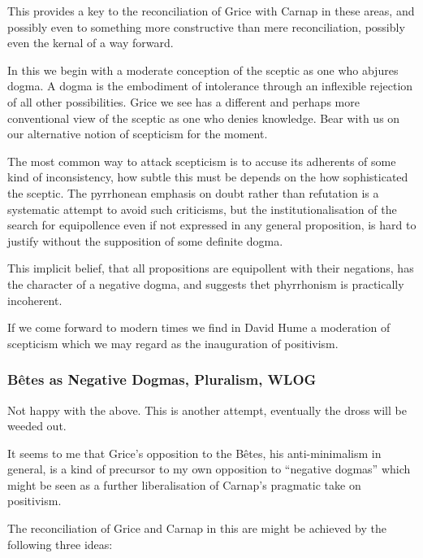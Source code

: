 \documentclass[10pt,titlepage]{book}
\begin{document}
This provides a key to the reconciliation of Grice with Carnap in these areas, and possibly even to something more constructive than mere reconciliation, possibly even the kernal of a way forward.

In this we begin with a moderate conception of the sceptic as one who abjures dogma.
A dogma is the embodiment of intolerance through an inflexible rejection of all other possibilities.
Grice we see has a different and perhaps more conventional view of the sceptic as one who denies knowledge.
Bear with us on our alternative notion of scepticism for the moment.

The most common way to attack scepticism is to accuse its adherents of some kind of inconsistency, how subtle this must be depends on the how sophisticated the sceptic.
The pyrrhonean emphasis on doubt rather than refutation is a systematic attempt to avoid such criticisms, but the institutionalisation of the search for equipollence even if not expressed in any general proposition, is hard to justify without the supposition of some definite dogma.

This implicit belief, that all propositions are equipollent with their negations, has the character of a negative dogma, and suggests thet phyrrhonism is practically incoherent.

If we come forward to modern times we find in David Hume a moderation of scepticism which we may regard as the inauguration of positivism.

\subsubsection{B\^etes as Negative Dogmas, Pluralism, WLOG}

Not happy with the above.
This is another attempt, eventually the dross will be weeded out.

It seems to me that Grice's opposition to the B\^etes, his anti-minimalism in general, is a kind of precursor to my own opposition to ``negative dogmas'' which might be seen as a further liberalisation of Carnap's pragmatic take on positivism.

The reconciliation of Grice and Carnap in this are might be achieved by the following three ideas:
\end{document}
